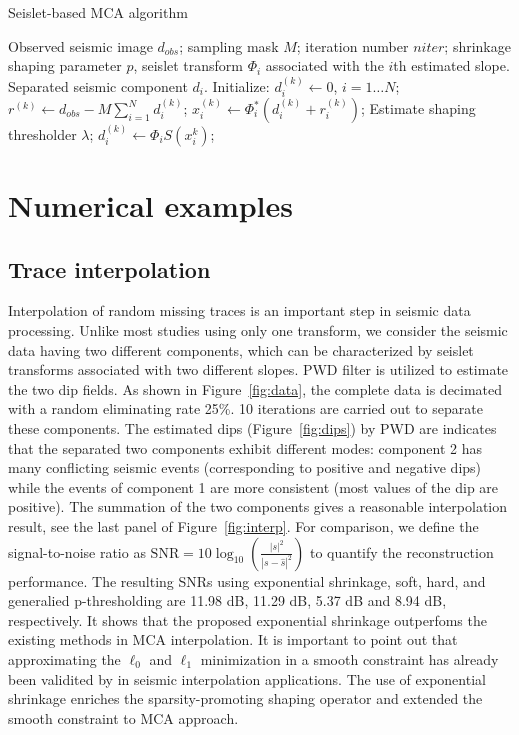 \begin{algorithm}[htb]
    \caption{Seislet-based MCA algorithm}\label{algorithm:lpmca}
    \begin{algorithmic}[1]
    \renewcommand{\algorithmicrequire}{\textbf{Input:}}
    \REQUIRE Observed seismic image $d_{obs}$; sampling mask $M$; iteration number $niter$; shrinkage shaping parameter $p$, seislet transform $\Phi_i$  associated with the $i$th estimated slope.
    \renewcommand{\algorithmicensure}{\textbf{Output:}}
    \ENSURE Separated seismic component $d_i$.
    \STATE Initialize: $d_i^{(k)}\leftarrow 0$, $ i=1\ldots N$;
            \STATE  $r^{(k)} \leftarrow d_{obs}-M\sum_{i=1}^N d_i^{(k)}$;
                \STATE  $x_i^{(k)}\leftarrow \Phi_i^*(d_i^{(k)}+r_i^{(k)})$;
                \STATE  Estimate shaping thresholder $\lambda$;
                \STATE  $d_i^{(k)}\leftarrow \Phi_i S(x_i^k) $;
            \ENDFOR
        \ENDFOR
    \end{algorithmic}
\end{algorithm}



\section{Numerical examples}

\subsection{Trace interpolation}

Interpolation of random missing traces is an important step in seismic data processing. Unlike most studies using only one transform, we consider the seismic data having two different components, which can be characterized by seislet transforms associated with two different slopes. PWD filter is utilized to estimate the two dip fields. As shown in Figure~\ref{fig:data}, the complete data is decimated with a random eliminating rate 25\%. 10 iterations are carried out to separate these components. The estimated dips (Figure~\ref{fig:dips}) by PWD are indicates that the separated two components exhibit different modes: component 2 has many conflicting seismic events (corresponding to positive and negative dips) while the events of component 1 are more consistent (most values of the dip are positive). The summation of the two components gives a reasonable interpolation result, see the last panel of Figure~\ref{fig:interp}. For comparison, we define the signal-to-noise ratio as $\mathrm{SNR}=10\log_{10}(\frac{|s|^2}{|s-\hat{s}|^2})$ to quantify the reconstruction performance. The resulting SNRs using exponential shrinkage, soft, hard, and generalied p-thresholding are 11.98 dB, 11.29 dB, 5.37 dB and 8.94 dB, respectively. It shows that the proposed exponential shrinkage outperfoms the existing methods in MCA interpolation. It is important to point out that approximating the $\ell_0$ and $\ell_1$ minimization in a smooth constraint has already been validited by \cite{cao2011review} in seismic interpolation applications. The use of exponential shrinkage enriches the sparsity-promoting shaping operator and extended the smooth constraint to MCA approach.


